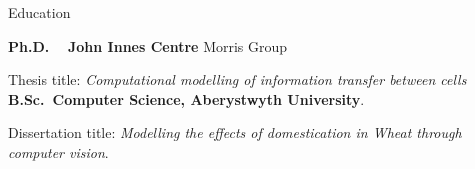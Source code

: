 \begin{rubric}{Education}

\entry*[2018 -- 2022]%
	\textbf{Ph.D. ~ John Innes Centre} Morris Group
	\par Thesis title: \emph{Computational modelling of information transfer
	between cells}
%
\entry*[2014 -- 2018]%
	\textbf{B.Sc.~Computer Science, Aberystwyth University}.\par
	Dissertation title: \emph{Modelling the effects of domestication in Wheat
	through computer vision}.


\end{rubric}